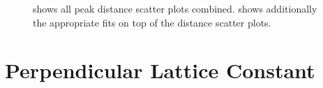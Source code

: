 \documentclass[a4paper,10pt]{scrartcl}
\begin{document}
\begin{figure}
\centering
{}
\caption{ shows all peak distance scatter plots combined.  shows additionally the appropriate fits on top of the distance scatter plots.}
\end{figure}

\section{Perpendicular Lattice Constant}
\end{document}

